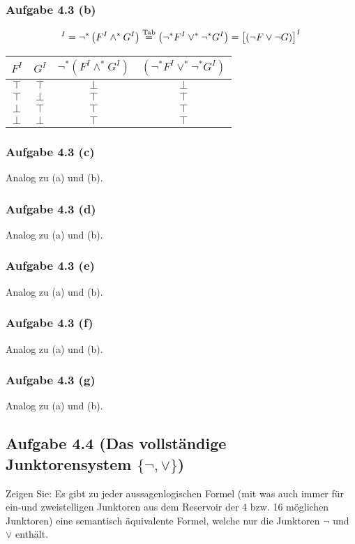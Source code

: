 \subsubsection{Aufgabe 4.3 (b)}
\begin{align*}
	[\neg(F\wedge G)]^I=\neg^\ast\left(F^I\wedge^\ast G^I\right)\stackeq{\text{Tab}}
	\left(\neg^\ast F^I\vee^\ast\neg^\ast G^I\right)=\big[(\neg F\vee\neg G)\big]^I
\end{align*}

\begin{tabular}{c|c||c|c}
	$F^I$ & $G^I$ & $\neg^\ast(F^I\wedge^\ast G^I)$ & $(\neg^\ast F^I\vee^\ast\neg^\ast G^I)$\\ \hline
	$\top$ & $\top$ & $\bot$ & $\bot$\\
	$\top$ & $\bot$ & $\top$ & $\top$\\
	$\bot$ & $\top$ & $\top$ & $\top$\\
	$\bot$ & $\bot$ & $\top$ & $\top$
\end{tabular}

\subsubsection{Aufgabe 4.3 (c)}
Analog zu (a) und (b).

\subsubsection{Aufgabe 4.3 (d)}
Analog zu (a) und (b).

\subsubsection{Aufgabe 4.3 (e)}
Analog zu (a) und (b).

\subsubsection{Aufgabe 4.3 (f)}
Analog zu (a) und (b).

\subsubsection{Aufgabe 4.3 (g)}
Analog zu (a) und (b).

\subsection{Aufgabe 4.4 (Das vollständige Junktorensystem \texorpdfstring{$\lbrace\neg, \vee\rbrace$}{lbrace neg,vee rbrace})}
Zeigen Sie: Es gibt zu jeder aussagenlogischen Formel (mit was auch immer für ein-und zweistelligen Junktoren aus dem Reservoir der 4 bzw. 16 möglichen Junktoren) eine
semantisch äquivalente Formel, welche nur die Junktoren $\neg$ und $\vee$ enthält.

